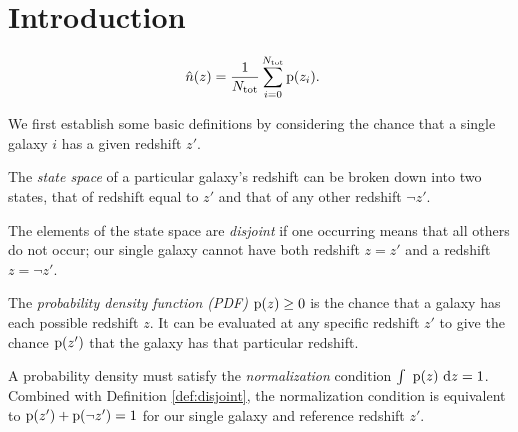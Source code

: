 \section{Introduction}


\begin{align}
\eqlabel{eqn:stack}
\hat{n}(z) &= \frac{1}{\ntot} \sum_{i = 0}^{\ntot} \pr{z_{i}} .
\end{align}


We first establish some basic definitions by considering the chance that a single galaxy $i$ has a given redshift $z'$.

\begin{definition}\label{def:binarystatespace}
	The \textit{state space} of a particular galaxy's redshift can be broken down into two states, that of redshift equal to $z'$ and that of any other redshift $\lnot z'$.
\end{definition}

\begin{definition}\label{def:disjoint}
	The elements of the state space are \textit{disjoint} if one occurring means that all others do not occur; our single galaxy cannot have both redshift $z = z'$ and a redshift $z = \lnot z'$.
\end{definition}

\begin{definition}\label{def:pdens}
	The \textit{probability density function (PDF)} $\mathrm{p}(z) \geq 0$ is the chance that a galaxy has each possible redshift $z$.
	It can be evaluated at any specific redshift $z'$ to give the chance $\mathrm{p}(z')$ that the galaxy has that particular redshift.
\end{definition}

\begin{definition}\label{def:normalization}
	A probability density must satisfy the \textit{normalization} condition $\int\ \mathrm{p}(z)\ \mathrm{d} z = 1$.
	Combined with Definition \ref{def:disjoint}, the normalization condition is equivalent to $\mathrm{p}(z') + \mathrm{p}(\lnot z') = 1$ for our single galaxy and reference redshift $z'$.
\end{definition}

